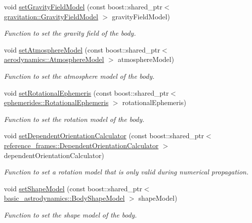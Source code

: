 \begin{DoxyCompactItemize}
void \hyperlink{classtudat_1_1simulation__setup_1_1Body_a66b39c1fb3827c1a59ba4f036e2b68d8}{set\+Gravity\+Field\+Model} (const boost\+::shared\+\_\+ptr$<$ \hyperlink{classtudat_1_1gravitation_1_1GravityFieldModel}{gravitation\+::\+Gravity\+Field\+Model} $>$ gravity\+Field\+Model)
\begin{DoxyCompactList}\small\item\em Function to set the gravity field of the body. \end{DoxyCompactList}\item 
void \hyperlink{classtudat_1_1simulation__setup_1_1Body_a2c14b27ed335c1dee68f943651f3be9a}{set\+Atmosphere\+Model} (const boost\+::shared\+\_\+ptr$<$ \hyperlink{classtudat_1_1aerodynamics_1_1AtmosphereModel}{aerodynamics\+::\+Atmosphere\+Model} $>$ atmosphere\+Model)
\begin{DoxyCompactList}\small\item\em Function to set the atmosphere model of the body. \end{DoxyCompactList}\item 
void \hyperlink{classtudat_1_1simulation__setup_1_1Body_ad72a4d4f70bf04344b4438480074178e}{set\+Rotational\+Ephemeris} (const boost\+::shared\+\_\+ptr$<$ \hyperlink{classtudat_1_1ephemerides_1_1RotationalEphemeris}{ephemerides\+::\+Rotational\+Ephemeris} $>$ rotational\+Ephemeris)
\begin{DoxyCompactList}\small\item\em Function to set the rotation model of the body. \end{DoxyCompactList}\item 
void \hyperlink{classtudat_1_1simulation__setup_1_1Body_aaeae7e6f9394ee839d1a578c80f33ed5}{set\+Dependent\+Orientation\+Calculator} (const boost\+::shared\+\_\+ptr$<$ \hyperlink{classtudat_1_1reference__frames_1_1DependentOrientationCalculator}{reference\+\_\+frames\+::\+Dependent\+Orientation\+Calculator} $>$ dependent\+Orientation\+Calculator)
\begin{DoxyCompactList}\small\item\em Function to set a rotation model that is only valid during numerical propagation. \end{DoxyCompactList}\item 
void \hyperlink{classtudat_1_1simulation__setup_1_1Body_ab64e549564945923504749067e0f0879}{set\+Shape\+Model} (const boost\+::shared\+\_\+ptr$<$ \hyperlink{classtudat_1_1basic__astrodynamics_1_1BodyShapeModel}{basic\+\_\+astrodynamics\+::\+Body\+Shape\+Model} $>$ shape\+Model)
\begin{DoxyCompactList}\small\item\em Function to set the shape model of the body. \end{DoxyCompactList}\item 

\end{DoxyCompactItemize}
